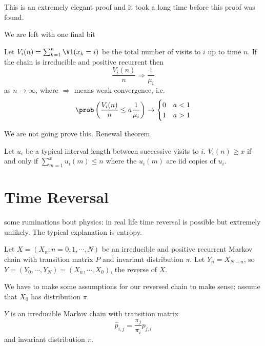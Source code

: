 \documentclass[a4paper]{article}
\begin{document}
This is an extremely elegant proof and it took a long time before this proof was found.

We are left with one final bit 

\begin{theorem}
  Let \(V_i(n) = \sum_{k = 1}^n \V 1(x_k = i)\) be the total number of visits to \(i\) up to time \(n\). If the chain is irreducible and positive recurrent then
  \[
    \frac{V_i(n)}{n} \Rightarrow \frac{1}{\mu_i}
  \]
  as \(n \to \infty\), where \(\Rightarrow\) means weak convergence, i.e.
  \[
    \prob \left( \frac{V_i(n)}{n} \leq a\frac{1}{\mu_i} \right) \to
    \begin{cases}
      0 & a < 1 \\
      1 & a > 1
    \end{cases}
  \]
\end{theorem}

We are not going prove this. Renewal theorem.

\begin{remark}
  Let \(u_i\) be a typical interval length between successive visits to \(i\). \(V_i(n) \geq x\) if and only if \(\sum_{m = 1}^x u_i(m) \leq n\) where the \(u_i(m)\) are iid copies of \(u_i\).
\end{remark}

\section{Time Reversal}

some ruminations bout physics: in real life time reversal is possible but extremely unlikely. The typical explanation is entropy.

Let \(X = (X_n: n = 0, 1, \cdots, N)\) be an irreducible and positive recurrent Markov chain with transition matrix \(P\) and invariant distribution \(\pi\). Let \(Y_n = X_{N - n}\), so \(Y = (Y_0, \cdots, Y_N) = (X_n, \cdots, X_0)\), the reverse of \(X\).

We have to make some assumptions for our reversed chain to make sense: assume that \(X_0\) has distribution \(\pi\).

\begin{theorem}
  \(Y\) is an irreducible Markov chain with transition matrix
  \[
    \hat p_{i,j} = \frac{\pi_j}{\pi_i} p_{j, i}
  \]
  and invariant distribution \(\pi\).
\end{theorem}
\end{document}
